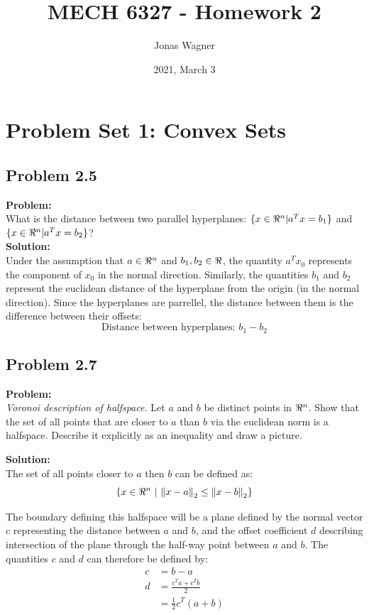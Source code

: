 \documentclass[letter]{article}
\title{MECH 6327 - Homework 2}
\author{Jonas Wagner}
\date{2021, March 3}
\begin{document}
\maketitle


\section{Problem Set 1: Convex Sets}

\subsection{Problem 2.5}
\textbf{Problem:}\\
What is the distance between two parallel hyperplanes: $\{x \in \real^n | a^T x = b_1\}$ and $\{x \in \real^n | a^T x = b_2\}$?\\

\noindent
\textbf{Solution:}\\
Under the assumption that $a\in \real^n$ and $b_1,b_2 \in \real$, the quantity $a^T x_0$ represents the component of $x_0$ in the normal direction. Similarly, the quantities $b_1$ and $b_2$ represent the euclidean distance of the hyperplane from the origin (in the normal direction). Since the hyperplanes are parrellel, the distance between them is the difference between their offsets:
\begin{equation}
	\text{Distance between hyperplanes: } b_1 - b_2
\end{equation}


\subsection{Problem 2.7}
\textbf{Problem:}\\
\textit{Voronoi description of halfspace.} Let $a$ and $b$ be distinct points in $\real^n$. Show that the set of all points that are closer to $a$ than $b$ via the euclidean norm is a halfspace. Describe it explicitly as an inequality and draw a picture.

\noindent
\textbf{Solution:}\\
The set of all points closer to $a$ then $b$ can be defined as:
\begin{equation}
	\{x \in \real^n \ | \ \norm{x-a}_2 \leq \norm{x-b}_2\}
\end{equation}

The boundary defining this halfspace will be a plane defined by the normal vector $c$ representing the distance between $a$ and $b$, and the offset coefficient $d$ describing intersection of the plane through the half-way point between $a$ and $b$. The quantities $c$ and $d$ can therefore be defined by:
\begin{equation}
	\begin{aligned}
		c &= b - a\\
		d &= \frac{c^T a + c^T b}{2}\\
		  &= \frac{1}{2} c^T (a+b)
	\end{aligned}
\end{equation}
\end{document}
